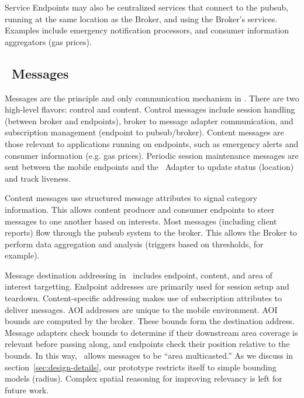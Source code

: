 Service Endpoints may also be centralized services that connect to the
pubsub, running at the same location as the Broker, and using the
Broker's services. Examples include emergency notification processors,
and consumer information aggregators (gas prices).

\subsection{\name~Messages}

Messages are the principle and only communication mechanism in
\name. There are two high-level flavors: control and
content. Control messages include session handling (between broker and
endpoints), broker to message adapter communication, and subscription
management (endpoint to pubsub/broker).  Content messages are those
relevant to applications running on endpoints, such as emergency
alerts and consumer information (e.g. gas prices).  Periodic session
maintenance messages are sent between the mobile endpoints and the
\name~Adapter to update status (location) and track liveness.


Content messages use structured 
message attributes to signal category information. This allows content
producer and consumer endpoints to steer messages to one another based
on interests. Most messages (including client reports) flow through
the pubsub system to the broker. This allows the Broker to perform
data aggregation and analysis (triggers based on thresholds, for
example).

Message destination addressing in \name~includes endpoint, content,
and area of interest targetting. Endpoint addresses are primarily used
for session setup and teardown. Content-specific addressing makes use
of subscription attributes to deliver messages. AOI addresses are
unique to the mobile environment. AOI bounds are computed by the
broker. These bounds form the destination address. Message adapters
check bounds to determine if their downstream area coverage is
relevant before passing along, and endpoints check their position
relative to the bounds.  In this way, \name~allows messages to be
``area multicasted.''  As we discuss in
section~\ref{sec:design-details}, our prototype restricts itself to
simple bounding models (radius). Complex spatial reasoning for
improving relevancy is left for future work.

